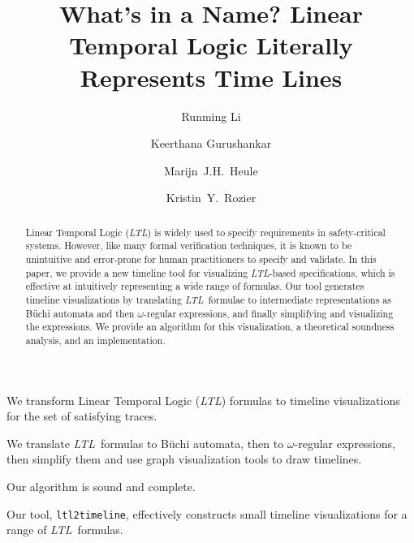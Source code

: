 \documentclass[preprint,12pt]{elsarticle}
\theoremstyle{definition}
\theoremstyle{remark}
\newcommand{\ltl}{\textit{LTL}}
\newcommand{\Buchi}{B\"{u}chi }
\newcommand{\tool}{\hspace{0.1cm}\texttt{ltl2timeline}\hspace{0.1cm}}
\begin{document}
\begin{frontmatter}
    \title{What's in a Name? Linear Temporal Logic Literally Represents Time Lines}

	\author[inst1]{Runming Li}

	\author[inst1]{Keerthana Gurushankar}

    \author[inst1]{Marijn~J.H.~Heule}

    \author[inst2]{Kristin~Y.~Rozier}




    \begin{abstract}
        Linear Temporal Logic (\ltl) is widely used to specify requirements in safety-critical systems.
        However, like many formal verification techniques, it is known to be unintuitive and error-prone for human practitioners to specify and validate.
        In this paper, we provide a new timeline tool for visualizing \ltl-based specifications, which is effective at intuitively representing a wide range of formulas.
        Our tool generates timeline visualizations by translating \ltl\ formulae to intermediate representations as \Buchi automata and then $\omega$-regular expressions, and finally simplifying and visualizing the expressions.
        We provide an algorithm for this visualization, a theoretical soundness analysis, and an implementation.
    \end{abstract}

    \begin{highlights}
        \item We transform Linear Temporal Logic (\ltl) formulas to timeline visualizations for the set of satisfying traces.
        \item We translate \ltl\ formulas to \Buchi automata, then to $\omega$-regular expressions, then simplify them and use graph visualization tools to draw timelines.
        \item Our algorithm is sound and complete.
        \item Our tool, \tool, effectively constructs small timeline visualizations for a range of \ltl\ formulas.
    \end{highlights}


\end{frontmatter}
\end{document}
